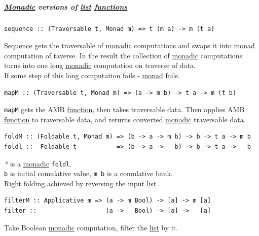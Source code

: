 \documentclass[a4paper,14pt,oneside]{book}
\begin{document}
\subparagraph{\hyperref[org6161b39]{Monadic} versions of \hyperref[org6f6de24]{list} \hyperref[org0da3116]{functions}}
\label{sec:orge48bf30}
\begin{verbatim}
sequence :: (Traversable t, Monad m) => t (m a) -> m (t a)
\end{verbatim}

\hyperref[org5549fb7]{Sequence} gets the traversable of \hyperref[org6161b39]{monadic} computations and swaps it into \hyperref[org27993ff]{monad} computation of taverse. In the result the collection of \hyperref[org6161b39]{monadic} computations turns into one long \hyperref[org6161b39]{monadic} computation on traverse of data.\\

If some step of this long computation fails - \hyperref[org27993ff]{monad} fails.\\

\begin{verbatim}
mapM :: (Traversable t, Monad m) => (a -> m b) -> t a -> m (t b)
\end{verbatim}

\texttt{mapM} gets the AMB \hyperref[org25ee224]{function}, then takes traversable data. Then applies AMB \hyperref[org25ee224]{function} to traversable data, and returns converted \hyperref[org6161b39]{monadic} traversable data.\\

\begin{verbatim}
foldM :: (Foldable t, Monad m) => (b -> a -> m b) -> b -> t a -> m b
foldl ::  Foldable t           => (b -> a ->   b) -> b -> t a ->   b
\end{verbatim}

\emph{*} is a \hyperref[org6161b39]{monadic} \texttt{foldl}.\\

\texttt{b} is initial comulative value, \texttt{m b} is a comulative bank.\\
Right folding achieved by reversing the input \hyperref[org6f6de24]{list}.\\

\begin{verbatim}
filterM :: Applicative m => (a -> m Bool) -> [a] -> m [a]
filter ::                   (a ->   Bool) -> [a] ->   [a]
\end{verbatim}

Take Boolean \hyperref[org6161b39]{monadic} computation, filter the \hyperref[org6f6de24]{list} by it.\\
\end{document}
